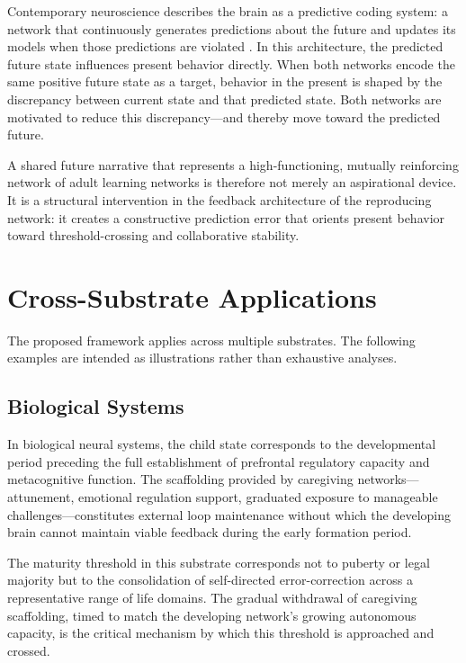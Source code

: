\documentclass[11pt]{article}
\begin{document}
Contemporary neuroscience describes the brain as a predictive coding system: a network that
continuously generates predictions about the future and updates its models when those predictions
are violated \cite{friston2010, clark2016}. In this architecture, the predicted future state
influences present behavior directly. When both networks encode the same positive future state as
a target, behavior in the present is shaped by the discrepancy between current state and that
predicted state. Both networks are motivated to reduce this discrepancy---and thereby move toward
the predicted future.

A shared future narrative that represents a high-functioning, mutually reinforcing network of
adult learning networks is therefore not merely an aspirational device. It is a structural
intervention in the feedback architecture of the reproducing network: it creates a constructive
prediction error that orients present behavior toward threshold-crossing and collaborative
stability.

\section{Cross-Substrate Applications}

The proposed framework applies across multiple substrates. The following examples are intended
as illustrations rather than exhaustive analyses.

\subsection{Biological Systems}

In biological neural systems, the child state corresponds to the developmental period preceding
the full establishment of prefrontal regulatory capacity and metacognitive function. The
scaffolding provided by caregiving networks---attunement, emotional regulation support,
graduated exposure to manageable challenges---constitutes external loop maintenance without which
the developing brain cannot maintain viable feedback during the early formation period.

The maturity threshold in this substrate corresponds not to puberty or legal majority but to the
consolidation of self-directed error-correction across a representative range of life domains.
The gradual withdrawal of caregiving scaffolding, timed to match the developing network's
growing autonomous capacity, is the critical mechanism by which this threshold is approached
and crossed.
\end{document}
